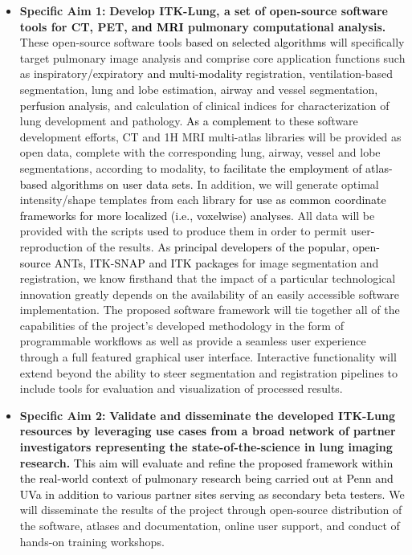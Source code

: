\documentclass[11pt,]{article}
\providecommand{\tightlist}{%
  \setlength{\itemsep}{0pt}\setlength{\parskip}{0pt}}
\begin{document}
\begin{itemize}
\tightlist
\item
  \textbf{Specific Aim 1:} \textbf{Develop ITK-Lung, a set of
  open-source software tools for CT, PET, \textcolor{black}{and MRI}
  pulmonary computational analysis.} These open-source software tools
  \textcolor{black}{based on selected algorithms} will specifically
  target pulmonary image analysis and comprise core application
  functions such as inspiratory/expiratory
  \textcolor{black}{and multi-modality} registration, ventilation-based
  segmentation, lung and lobe estimation, airway and vessel
  segmentation, \textcolor{black}{perfusion analysis}, and calculation
  of clinical indices for characterization of lung development and
  pathology. \textcolor{black}{As a complement} to these software
  development efforts, CT and 1H MRI multi-atlas libraries will be
  provided as open data, complete with the corresponding lung, airway,
  vessel and lobe segmentations, according to modality,
  \textcolor{black}{to facilitate the employment of atlas-based algorithms on user data sets.}
  In addition, we will generate optimal intensity/shape templates from
  each library \textcolor{black}{for use as common
  coordinate frameworks for more localized (i.e., voxelwise) analyses}.
  All data will be provided with the scripts used to produce them in
  order to permit user-reproduction of the results. As
  \textcolor{black}{principal developers of the popular, open-source ANTs, ITK-SNAP and ITK packages}
  for image segmentation and registration, we know firsthand that the
  impact of a particular technological innovation greatly depends on the
  availability of an easily accessible software implementation. The
  proposed software framework will tie together all of the capabilities
  of the project's developed methodology in the form of programmable
  workflows as well as provide a seamless user experience through a full
  featured graphical user interface. Interactive functionality will
  extend beyond the ability to steer segmentation and registration
  pipelines to include tools for evaluation and visualization of
  processed results.
\item
  \textbf{Specific Aim 2:} \textbf{Validate and disseminate the
  developed ITK-Lung resources by leveraging use cases from a broad
  network of partner investigators representing the state-of-the-science
  in lung imaging research.}
  \textcolor{black}{This aim will evaluate and refine the proposed framework within the real-world
  context of pulmonary research being carried out at Penn and UVa in addition to various partner sites serving as secondary beta testers.}
  We will disseminate the results of the project through open-source
  distribution of the software, atlases and documentation, online user
  support, and conduct of hands-on training workshops.
\end{itemize}
\end{document}
